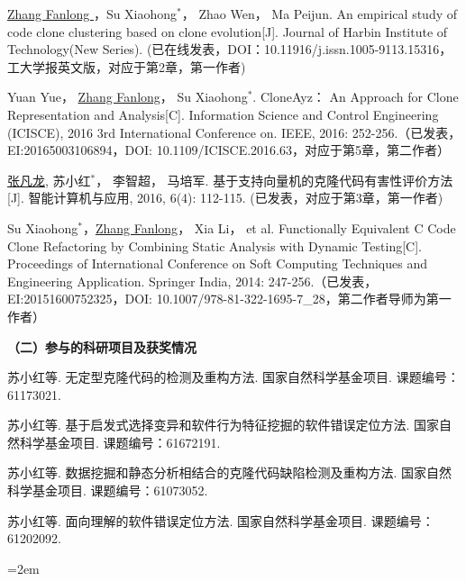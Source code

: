 \begin{publist}
\item
\underline{Zhang Fanlong }，Su Xiaohong{$^*$}， Zhao Wen， Ma Peijun. An empirical study of code clone clustering based on clone evolution[J]. Journal of Harbin Institute of Technology(New Series). (已在线发表，DOI：10.11916/j.issn.1005-9113.15316，工大学报英文版，对应于第2章，第一作者)

\item
Yuan Yue， \underline{Zhang Fanlong}， Su Xiaohong{$^*$}. CloneAyz： An Approach for Clone Representation and Analysis[C]. Information Science and Control Engineering (ICISCE), 2016 3rd International Conference on. IEEE, 2016: 252-256.（已发表，EI:20165003106894，DOI:	10.1109/ICISCE.2016.63，对应于第5章，第二作者）
\item
\underline{张凡龙}, 苏小红{$^*$}， 李智超， 马培军. 基于支持向量机的克隆代码有害性评价方法[J]. 智能计算机与应用, 2016, 6(4): 112-115. (已发表，对应于第3章，第一作者)

\item
Su Xiaohong{$^*$}，\underline{Zhang Fanlong}， Xia Li， et al. Functionally Equivalent C Code Clone Refactoring by Combining Static Analysis with Dynamic Testing[C]. Proceedings of International Conference on Soft Computing Techniques and Engineering Application. Springer India, 2014: 247-256.（已发表，EI:20151600752325，DOI: 10.1007/978-81-322-1695-7\_28，第二作者导师为第一作者）
\end{publist}




\noindent\textbf{（二）参与的科研项目及获奖情况}
\begin{publist}
\item	
苏小红等. 无定型克隆代码的检测及重构方法. 国家自然科学基金项目. 课题编号：61173021.
\item 
苏小红等. 基于启发式选择变异和软件行为特征挖掘的软件错误定位方法. 国家自然科学基金项目. 课题编号：61672191.
\item
苏小红等. 数据挖掘和静态分析相结合的克隆代码缺陷检测及重构方法. 国家自然科学基金项目. 课题编号：61073052.
\item
苏小红等. 面向理解的软件错误定位方法. 国家自然科学基金项目. 课题编号：61202092.

\end{publist}
\vfill
{}\hangindent=2em\noindent

\setlength{\parindent}{2em}
